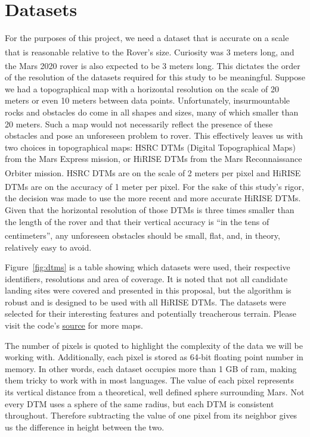 \documentclass[12pt]{article}
\newcommand{\supcite}[1]{\textsuperscript{\cite{#1}}}
\begin{document}
\section{Datasets}
\label{sec:datasets}
\par For the purposes of this project, we need a dataset that is accurate on a scale that is reasonable relative to the Rover's size. Curiosity was 3 meters long\supcite{bib:curiosity}, and the Mars 2020 rover is also expected to be 3 meters long\supcite{bib:rover2020}. This dictates the order of the resolution of the datasets required for this study to be meaningful. Suppose we had a topographical map with a horizontal resolution on the scale of 20 meters or even 10 meters between data points. Unfortunately, insurmountable rocks and obstacles do come in all shapes and sizes, many of which smaller than 20 meters. Such a map would not necessarily reflect the presence of these obstacles and pose an unforeseen problem to rover. This effectively leaves us with two choices in topographical maps: HSRC DTMs (Digital Topographical Maps) from the Mars Express mission, or HiRISE DTMs from the Mars Reconnaissance Orbiter mission. HSRC DTMs are on the scale of 2 meters per pixel\supcite{bib:hsrc} and HiRISE DTMs are on the accuracy of 1 meter per pixel\supcite{bib:abouthirise}. For the sake of this study's rigor, the decision was made to use the more recent and more accurate HiRISE DTMs. Given that the horizontal resolution of those DTMs is three times smaller than the length of the rover and that their vertical accuracy is ``in the tens of centimeters''\supcite{bib:abouthirise}, any unforeseen obstacles should be small, flat, and, in theory, relatively easy to avoid.
\par Figure~\ref{fig:dtms} is a table showing which datasets were used, their respective identifiers, resolutions and area of coverage. It is noted that not all candidate landing sites were covered and presented in this proposal, but the algorithm is robust and is designed to be used with all HiRISE DTMs. The datasets were selected for their interesting features and potentially treacherous terrain. Please visit the code's \href{https://github.com/PapaCharlie/Rover-Climb-Angles/tree/master/figures/maps/}{\ttfamily\color{blue} \underline{source}} for more maps.
\par The number of pixels is quoted to highlight the complexity of the data we will be working with. Additionally, each pixel is stored as 64-bit floating point number in memory. In other words, each dataset occupies more than 1 GB of ram, making them tricky to work with in most languages. The value of each pixel represents its vertical distance from a theoretical, well defined sphere surrounding Mars. Not every DTM uses a sphere of the same radius, but each DTM is consistent throughout. Therefore subtracting the value of one pixel from its neighbor gives us the difference in height between the two.
\end{document}
